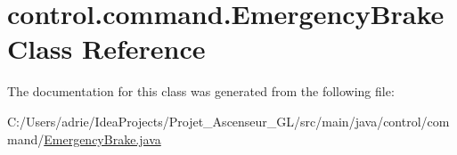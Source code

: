 \hypertarget{classcontrol_1_1command_1_1_emergency_brake}{}\section{control.\+command.\+Emergency\+Brake Class Reference}
\label{classcontrol_1_1command_1_1_emergency_brake}


The documentation for this class was generated from the following file\+:\begin{DoxyCompactItemize}
\item 
C\+:/\+Users/adrie/\+Idea\+Projects/\+Projet\+\_\+\+Ascenseur\+\_\+\+G\+L/src/main/java/control/command/\mbox{\hyperlink{_emergency_brake_8java}{Emergency\+Brake.\+java}}\end{DoxyCompactItemize}
